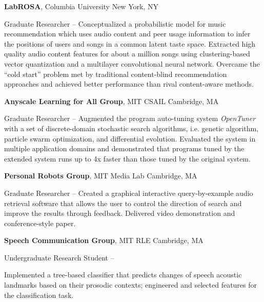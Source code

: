 \documentclass[a4paper,10pt,oneside]{article}
\begin{document}
\begin{body}
\textbf{LabROSA}, Columbia University
\hfill New York, NY
\par Graduate Researcher
\hfill
{} --
\BulletItem Conceptualized a probabilistic model for music recommendation which uses audio content and peer usage
information to infer the positions of users and songs in a common latent taste space.
\BulletItem Extracted high quality audio content features for about a million songs using clustering-based vector quantization
and a multilayer convolutional neural network.
\BulletItem Overcame the “cold start” problem met by traditional content-blind recommendation approaches and achieved better performance than rival content-aware methods.

\textbf{Anyscale Learning for All Group}, MIT CSAIL
\hfill Cambridge, MA
\par Graduate Researcher
\hfill
{} --
\BulletItem
Augmented the program auto-tuning system \emph{OpenTuner} with a set of discrete-domain stochastic search algorithms, i.e. genetic algorithm, particle swarm optimization, and differential evolution. 
\BulletItem
Evaluated the system in multiple application domains and demonstrated that programs tuned by the extended
system runs up to 4x faster than those tuned by the original system.

\textbf{Personal Robots Group}, MIT Media Lab
\hfill Cambridge, MA
\par Graduate Researcher
\hfill
{} --
\BulletItem Created a graphical interactive query-by-example audio retrieval software that allows the user to control the
direction of search and improve the results through feedback.
\BulletItem Delivered video demonstration and conference-style paper.
 

\textbf{Speech Communication Group},
MIT RLE
\hfill Cambridge, MA
\par
Undergraduate Research Student
\hfill
{} --
\begin{detail}
\BulletItem
Implemented a tree-based classifier that predicts changes of speech acoustic landmarks based on their prosodic
contexts; engineered and selected features for the classification task.
\end{detail}

%



\end{body}
\end{document}
